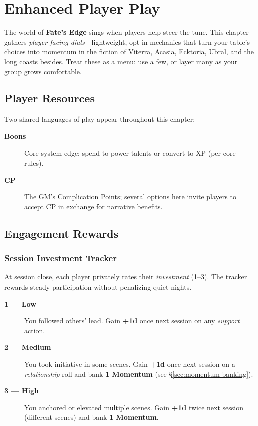 
\chapter{Enhanced Player Play}
\label{ch:enhanced-play}

\begin{multicols}{2}

The world of \textbf{Fate’s Edge} sings when players help steer the tune. This chapter gathers \emph{player-facing dials}—lightweight, opt-in mechanics that turn your table’s choices into momentum in the fiction of Viterra, Acasia, Ecktoria, Ubral, and the long coasts besides. Treat these as a menu: use a few, or layer many as your group grows comfortable.

\section{Player Resources}

Two shared languages of play appear throughout this chapter:
\begin{description}
  \item[\textbf{Boons}] Core system edge; spend to power talents or convert to XP (per core rules).
  \item[\textbf{CP}] The GM’s Complication Points; several options here invite players to accept CP in exchange for narrative benefits.
\end{description}

\section{Engagement Rewards}

\subsection{Session Investment Tracker}
At session close, each player privately rates their \emph{investment} (1–3). The tracker rewards steady participation without penalizing quiet nights.

\begin{description}
  \item[\textbf{1 — Low}] You followed others’ lead. Gain \textbf{+1d} once next session on any \emph{support} action.
  \item[\textbf{2 — Medium}] You took initiative in some scenes. Gain \textbf{+1d} once next session on a \emph{relationship} roll and bank \textbf{1 Momentum} (see \S\ref{sec:momentum-banking}).%
  \item[\textbf{3 — High}] You anchored or elevated multiple scenes. Gain \textbf{+1d} twice next session (different scenes) and bank \textbf{1 Momentum}.%
\end{description}


\end{multicols}
